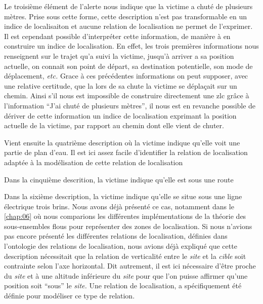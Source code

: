 Le troisième élément de l'alerte nous indique que la victime a chuté
de plusieurs mètres. Prise sous cette forme, cette description n'est
pas transformable en un indice de localisaiton et aucune relation de
localisation ne permet de l'exprimer. Il est cependant possible
d'interpréter cette information, de manière à en construire un indice
de localisation. En effet, les trois premières informations nous
renseignent sur le trajet qu'a suivi la victime, jusqu'à arriver a sa
position actuelle, on connait son point de départ, sa destination
potentielle, son mode de déplacement, \emph{etc.} Grace à ces
précédentes informations on peut supposer, avec une relative
certitude, que la lors de sa chute la victime se déplaçait sur un
chemin. Ainsi s'il nous est impossible de construire directement une
\ac{zlc} grâce à l'information \enquote{J'ai chuté de plusieurs
  mètres}, il nous est en revanche possible de dériver de cette
information un indice de localisation exprimant la position actuelle
de la victime, par rapport au chemin dont elle vient de chuter.



Vient ensuite la quatrième description où la victime indique qu'elle
voit une partie de plan d'eau.
%
Il est ici assez facile d’identifier la relation de localisation
adaptée à la modélisation de cette relation de localisation



Dans la cinquième descrition, la victime indique qu'elle est sous une
route


Dans la sixième description, la victime indique qu'elle se situe sous
une ligne électrique trois brins.
%
Nous avons déjà présenté ce cas, notamment dans le \autoref{chap:06}
où nous comparions les différentes implémentations de la théorie des
sous-ensembles flous pour représenter des zones de localisation. Si
nous n'avions pas encore présenté les différentes relations de
localisation, définies dans l'ontologie des relations de localisation,
nous avions déjà expliqué que cette description nécessitait que la
relation de verticalité entre le \emph{site} et la \emph{cible} soit
contrainte selon l'axe horizontal. Dit autrement, il est ici
nécessaire d'être proche du \emph{site} et à une altitude inférieure
du \emph{site} pour que l'on puisse affirmer qu'une position soit
\enquote{sous} le \emph{site.} Une relation de localisation,
 a spécifiquement été définie pour modéliser ce
type de relation.


